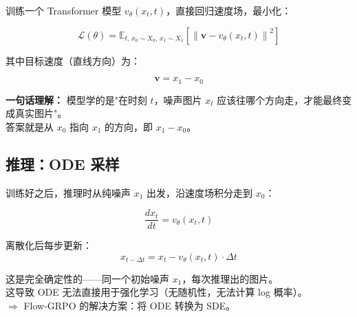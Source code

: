 训练一个 Transformer 模型 $v_\theta(x_t, t)$，直接回归速度场，最小化：

\[
\mathcal{L}(\theta) = \mathbb{E}_{t,\, x_0 \sim X_0,\, x_1 \sim X_1} \left[ \left\| \boldsymbol{v} - v_\theta(x_t, t) \right\|^2 \right] \tag{2}
\]

其中目标速度（直线方向）为：

\[
\boldsymbol{v} = x_1 - x_0
\]

\begin{summarybox}
\textbf{一句话理解：} 模型学的是"在时刻 $t$，噪声图片 $x_t$ 应该往哪个方向走，才能最终变成真实图片"。\\
答案就是从 $x_0$ 指向 $x_1$ 的方向，即 $x_1 - x_0$。
\end{summarybox}

\subsection{推理：ODE 采样}

训练好之后，推理时从纯噪声 $x_1$ 出发，沿速度场积分走到 $x_0$：

\[
\frac{dx_t}{dt} = v_\theta(x_t, t)
\]

离散化后每步更新：
\[
x_{t - \Delta t} = x_t - v_\theta(x_t, t) \cdot \Delta t
\]

\begin{warnbox}
 这是完全确定性的——同一个初始噪声 $x_1$，每次推理出的图片。\\
这导致 ODE 无法直接用于强化学习（无随机性，无法计算 log 概率）。\\
$\Rightarrow$ Flow-GRPO 的解决方案：将 ODE 转换为 SDE。
\end{warnbox}
